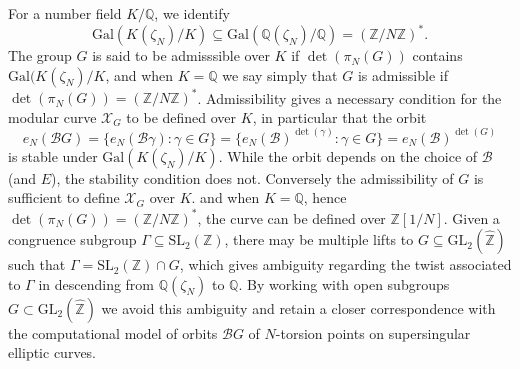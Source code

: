 \documentclass{amsart}
\newcommand{\cB}{\mathcal{B}}
\newcommand{\QQ}{\mathbb{Q}}
\newcommand{\ZZ}{\mathbb{Z}}
\newcommand{\ZZhat}{\widehat{\ZZ}}
\newcommand{\XC}{\mathcal{X}}
\newcommand{\GL}{\mathrm{GL}}
\newcommand{\SL}{\mathrm{SL}}
\newcommand{\Gal}{\mathrm{Gal}}
\begin{document}
For a number field $K/\QQ$, we identify
$$
\Gal(K(\zeta_N)/K) \subseteq \Gal(\QQ(\zeta_N)/\QQ) = (\ZZ/N\ZZ)^*.
$$
The group $G$ is said to be admisssible over $K$ if $\det(\pi_N(G))$ contains
$\Gal(K(\zeta_N)/K$, and when $K = \QQ$ we say simply that $G$ is admissible
if $\det(\pi_N(G)) = (\ZZ/N\ZZ)^*$.  Admissibility gives a necessary condition
for the modular curve $\XC_G$ to be defined over $K$, in particular that the
orbit
$$
e_N(\cB{G}) =
\{ e_N(\cB\gamma) : \gamma \in G \} =
\{ e_N(\cB)^{\det(\gamma)} : \gamma \in G \} = e_N(\cB)^{\det(G)}
$$
is stable under $\Gal(K(\zeta_N)/K)$. While the orbit depends on
the choice of $\cB$ (and $E$), the stability condition does not.
Conversely the admissibility of $G$ is sufficient to define $\XC_G$
over $K$.
and when $K = \QQ$, hence $\det(\pi_N(G)) = (\ZZ/N\ZZ)^*$, the curve
can be defined over $\ZZ[1/N]$. %
Given a congruence subgroup $\Gamma \subseteq \SL_2(\ZZ)$, there may be multiple
lifts to $G \subseteq \GL_2(\ZZhat)$ such that $\Gamma = \SL_2(\ZZ) \cap G$,
which gives ambiguity regarding the twist associated to $\Gamma$ in descending
from $\QQ(\zeta_N)$ to $\QQ$.
By working with open subgroups $G \subset \GL_2(\ZZhat)$ we avoid this
ambiguity and retain a closer correspondence with the computational model
of orbits $\cB{G}$ of $N$-torsion points on supersingular elliptic curves.

\end{document}
